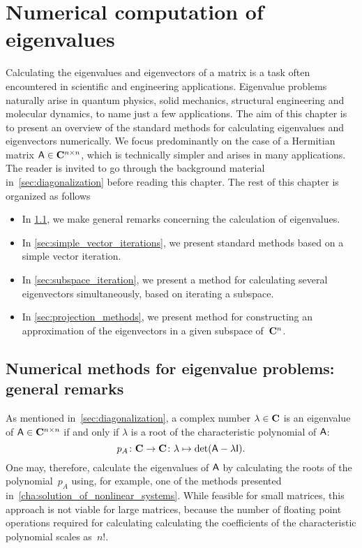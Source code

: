 \chapter{Numerical computation of eigenvalues}%
\label{cha:numerical_computation_of_eigenvalues}
\minitoc

Calculating the eigenvalues and eigenvectors of a matrix is a task often encountered in scientific and engineering applications.
Eigenvalue problems naturally arise in quantum physics,
solid mechanics, structural engineering and molecular dynamics,
to name just a few applications.
The aim of this chapter is to present an overview of the standard methods for calculating eigenvalues and eigenvectors numerically.
We focus predominantly on the case of a Hermitian matrix $\mathsf A \in \mathbf C^{n \times n}$,
which is technically simpler and arises in many applications.
The reader is invited to go through the background material in~\cref{sec:diagonalization} before reading this chapter.
The rest of this chapter is organized as follows
\begin{itemize}
    \item
        In \cref{sec:general_remarks},
        we make general remarks concerning the calculation of eigenvalues.

    \item
        In \cref{sec:simple_vector_iterations},
        we present standard methods based on a simple vector iteration.

    \item
        In \cref{sec:subspace_iteration},
        we present a method for calculating several eigenvectors simultaneously,
        based on iterating a subspace.

    \item
        In \cref{sec:projection_methods},
        we present method for constructing an approximation of the eigenvectors in a given subspace of~$\mathbf C^{n}$.
\end{itemize}

\section{Numerical methods for eigenvalue problems: general remarks}
\label{sec:general_remarks}

As mentioned in~\cref{sec:diagonalization},
a complex number $\lambda \in \mathbf C$ is an eigenvalue of $\mathsf A \in \mathbf C^{n \times n}$
if and only if $\lambda$ is a root of the characteristic polynomial of $\mathsf A$:
\[
    p_A
    \colon \mathbf C \to \mathbf C
    \colon \lambda \mapsto \det (\mathsf A - \lambda \mathsf I).
\]
One may,
therefore,
calculate the eigenvalues of $\mathsf A$ by calculating the roots of the polynomial~$p_A$ using,
for example, one of the methods presented in~\cref{cha:solution_of_nonlinear_systems}.
While feasible for small matrices,
this approach is not viable for large matrices,
because the number of floating point operations required for calculating calculating the coefficients of the characteristic polynomial scales as~$n!$.

